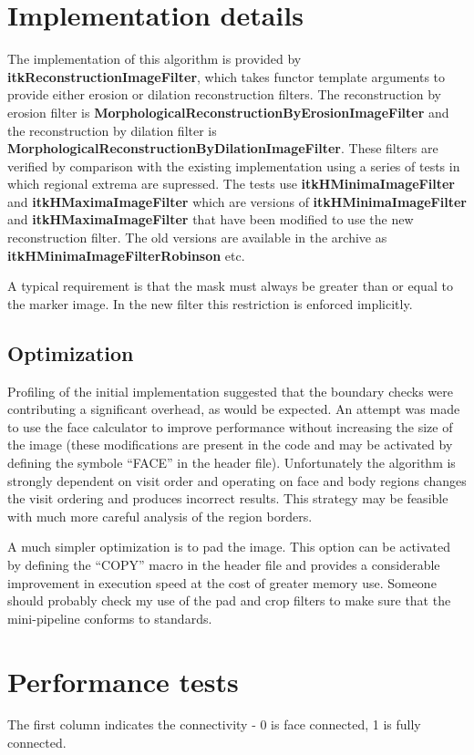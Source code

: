 \documentclass{InsightArticle}
\begin{document}
\section{Implementation details}
The implementation of this algorithm is provided by {\bf
itkReconstructionImageFilter}, which takes functor template arguments
to provide either erosion or dilation reconstruction filters. The
reconstruction by erosion filter is {\bf
MorphologicalReconstructionByErosionImageFilter} and the
reconstruction by dilation filter is {\bf
MorphologicalReconstructionByDilationImageFilter}. These filters are
verified by comparison with the existing implementation using a series
of tests in which regional extrema are supressed. The tests use {\bf
itkHMinimaImageFilter} and {\bf itkHMaximaImageFilter} which are
versions of {\bf itkHMinimaImageFilter} and {\bf
itkHMaximaImageFilter} that have been modified to use the new
reconstruction filter. The old versions are available in the archive
as {\bf itkHMinimaImageFilterRobinson} etc.

A typical requirement is that the mask must always be greater than or
equal to the marker image. In the new filter this restriction is
enforced implicitly.

\subsection{Optimization}
Profiling of the initial implementation suggested that the boundary
checks were contributing a significant overhead, as would be
expected. An attempt was made to use the face calculator to improve
performance without increasing the size of the image (these
modifications are present in the code and may be activated by defining
the symbole ``FACE'' in the header file). Unfortunately the algorithm
is strongly dependent on visit order and operating on face and body
regions changes the visit ordering and produces incorrect
results. This strategy may be feasible with much more careful analysis
of the region borders.

A much simpler optimization is to pad the image. This option can be
activated by defining the ``COPY'' macro in the header file and
provides a considerable improvement in execution speed at the cost of
greater memory use. Someone should probably check my use of the pad
and crop filters to make sure that the mini-pipeline conforms to
standards.
\section{Performance tests}
The first column indicates the connectivity - 0 is face connected, 1
is fully connected.
\end{document}
